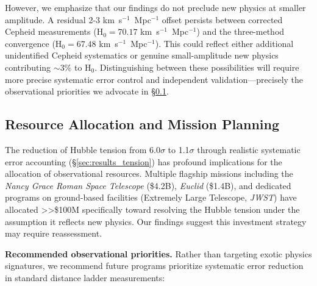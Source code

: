 \documentclass[twocolumn, linenumbers]{aastex701}
\begin{document}
However, we emphasize that our findings do not preclude new physics at smaller amplitude. A residual 2-3 km~s$^{-1}$~Mpc$^{-1}$ offset persists between corrected Cepheid measurements (H$_0 = 70.17$ km~s$^{-1}$~Mpc$^{-1}$) and the three-method convergence (H$_0 = 67.48$ km~s$^{-1}$~Mpc$^{-1}$). This could reflect either additional unidentified Cepheid systematics or genuine small-amplitude new physics contributing $\sim$3\% to H$_0$. Distinguishing between these possibilities will require more precise systematic error control and independent validation---precisely the observational priorities we advocate in \S\ref{sec:discussion_resources}.

\subsection{Resource Allocation and Mission Planning} \label{sec:discussion_resources}

The reduction of Hubble tension from 6.0$\sigma$ to 1.1$\sigma$ through realistic systematic error accounting (\S\ref{sec:results_tension}) has profound implications for the allocation of observational resources. Multiple flagship missions including the \textit{Nancy Grace Roman Space Telescope} (\$4.2B), \textit{Euclid} (\$1.4B), and dedicated programs on ground-based facilities (Extremely Large Telescope, \textit{JWST}) have allocated >>\$100M specifically toward resolving the Hubble tension under the assumption it reflects new physics. Our findings suggest this investment strategy may require reassessment.

\textbf{Recommended observational priorities.} Rather than targeting exotic physics signatures, we recommend future programs prioritize systematic error reduction in standard distance ladder measurements:
\end{document}
